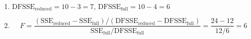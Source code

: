 \documentclass{article}
\begin{document}
\begin{enumerate}[leftmargin = 0 em, label = \arabic*., font = \bfseries]
\begin{enumerate}
		      \item
		            $\mathrm{DFSSE}_{\mathrm{reduced}} = 10 - 3 = 7,\, \mathrm{DFSSE}_{\mathrm{full}} = 10 - 4 = 6$

		      \item
		            \[F = \frac{(\mathrm{SSE}_{\mathrm{reduced}} - \mathrm{SSE}_{\mathrm{full}})/(\mathrm{DFSSE}_{\mathrm{reduced}} - \mathrm{DFSSE}_{\mathrm{full}})}{\mathrm{SSE}_{\mathrm{full}}/\mathrm{DFSSE}_{\mathrm{full}}} = \frac{24 - 12}{12/6} = 6\]
	      \end{enumerate}

\end{enumerate}
\end{document}
